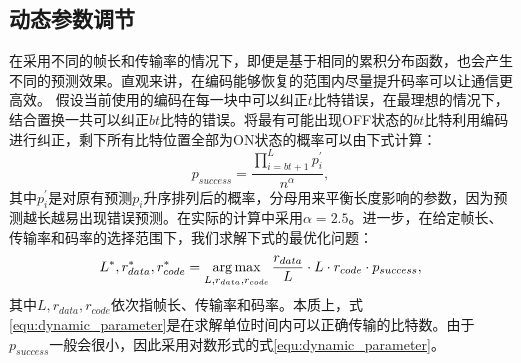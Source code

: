 \subsection{动态参数调节}

在采用不同的帧长和传输率的情况下，即便是基于相同的累积分布函数，也会产生不同的预测效果。直观来讲，在编码能够恢复的范围内尽量提升码率可以让通信更高效。
假设当前使用的编码在每一块中可以纠正$t$比特错误，在最理想的情况下，结合置换一共可以纠正$bt$比特的错误。将最有可能出现OFF状态的$bt$比特利用编码进行纠正，剩下所有比特位置全部为ON状态的概率可以由下式计算：
\begin{equation}
p_{success} = \frac{\prod_{i = bt+1}^{L} p_i^{'}}{n^\alpha},
\end{equation}
其中$p_i^{'}$是对原有预测$p_i$升序排列后的概率，分母用来平衡长度影响的参数，因为预测越长越易出现错误预测。在实际的计算中采用$\alpha=2.5$。进一步，在给定帧长、传输率和码率的选择范围下，我们求解下式的最优化问题：
\begin{equation}
\label{equ:dynamic_parameter}
L^\ast, r_{data}^\ast, r_{code}^\ast = \operatorname*{arg\,max}_{L, r_{data}, r_{code}} \frac{r_{data}}{L}\cdot L\cdot r_{code} \cdot p_{success},
\end{equation}
其中$L,r_{data},r_{code}$依次指帧长、传输率和码率。本质上，式\ref{equ:dynamic_parameter}是在求解单位时间内可以正确传输的比特数。由于$p_{success}$一般会很小，因此采用对数形式的式\ref{equ:dynamic_parameter}。